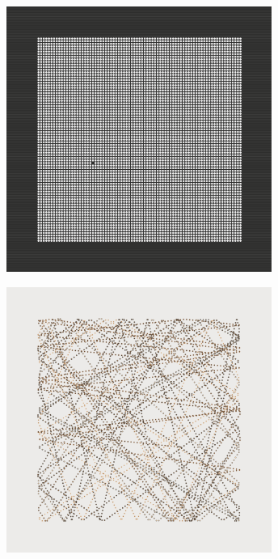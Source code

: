 \documentclass[11pt,twoside]{book}
\begin{document}
\begin{figure}[!ht]
\includegraphics[width=246pt]{cool-bw-fa4b9823-a7ad-4b64-ae97-4819edad5bdb.png}
\end{figure}
\newpage
{}
\fancyfoot[CE,CO]{\fontsize{10}{12}\selectfont \thepage}
\begin{figure}[!ht]
\includegraphics[width=246pt]{mocha-ae2231cf-62a9-47a2-a1af-e212edcd8ed3.png}
\end{figure}
\newpage
{}
\fancyfoot[CE,CO]{\fontsize{10}{12}\selectfont \thepage}
\end{document}
